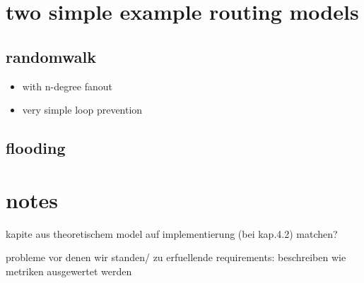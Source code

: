 \section{two simple example routing models}


\subsection{randomwalk}
\begin{itemize}
\item            with n-degree fanout
\item            very simple loop prevention
\end{itemize}
\subsection{flooding}

\section{notes}
kapite aus theoretischem model auf implementierung (bei kap.4.2) matchen?

probleme vor denen wir standen/ zu erfuellende requirements: beschreiben wie metriken ausgewertet werden
